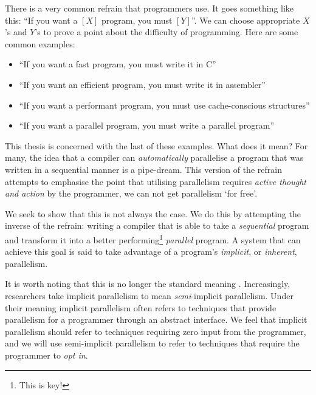 There is a very common refrain that programmers use. It goes something like
this: ``If you want a $[X]$ program, you must $[Y]$''. We can choose
appropriate $X$'s and $Y$'s to prove a point about the difficulty of
programming. Here are some common examples:

\begin{itemize}
  \item ``If you want a fast program, you must write it in C''
  \item ``If you want an efficient program, you must write it in
            assembler''
  \item ``If you want a performant program, you must use
            cache-conscious structures''
  \item ``If you want a parallel program, you must write a parallel
            program''
\end{itemize}

This thesis is concerned with the last of these examples. What does it mean?
For many, the idea that a compiler can \emph{automatically} parallelise a
program that was written in a sequential manner is a pipe-dream. This version
of the refrain attempts to emphasise the point that utilising parallelism
requires \emph{active thought and action} by the programmer, we can not get
parallelism `for free'.

We seek to show that this is not always the case. We do this by attempting
the inverse of the refrain: writing a compiler that is able to take a
\emph{sequential} program and transform it into a better
performing\footnote{This is key!} \emph{parallel} program.  A system that
can achieve this goal is said to take advantage of a program's
\emph{implicit}, or \emph{inherent}, parallelism.


It is worth noting that this is no longer the standard meaning
\citep{belikov2013survey}. Increasingly, researchers take implicit
parallelism to mean \emph{semi}-implicit parallelism.  Under their meaning implicit parallelism often refers
to techniques that provide parallelism for a programmer through an abstract
interface. We feel that implicit parallelism should refer to techniques
requiring zero input from the programmer, and we will use semi-implicit
parallelism to refer to techniques that require the programmer to \emph{opt
in}.
